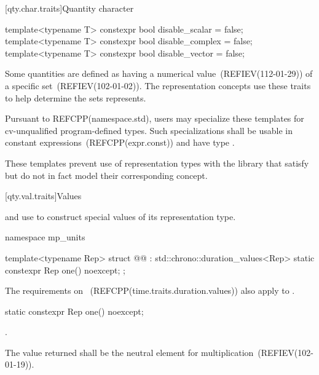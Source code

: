 [qty.char.traits]{Quantity character}

\begin{itemdecl}
template<typename T>
constexpr bool disable_scalar = false;
template<typename T>
constexpr bool disable_complex = false;
template<typename T>
constexpr bool disable_vector = false;
\end{itemdecl}

\begin{itemdescr}
\pnum
Some quantities are defined as having a numerical value~(REFIEV(112-01-29)) of a specific set~(REFIEV(102-01-02)).
The representation concepts use these traits
to help determine the sets  represents.

\pnum
\remarks
Pursuant to REFCPP(namespace.std),
users may specialize these templates
for cv-unqualified program-defined types.
Such specializations shall be usable in constant expressions~(REFCPP(expr.const))
and have type .

\pnum
\begin{note}
These templates prevent use of representation types with the library
that satisfy but do not in fact model their corresponding concept.
\end{note}
\end{itemdescr}

[qty.val.traits]{Values}

\pnum
{} and  use 
to construct special values of its representation type.

\begin{codeblock}
namespace mp_units {

template<typename Rep>
struct @@ : std::chrono::duration_values<Rep> {
  static constexpr Rep one() noexcept;
};

}
\end{codeblock}

\pnum
The requirements on ~(REFCPP(time.traits.duration.values))
also apply to .

\begin{itemdecl}
static constexpr Rep one() noexcept;
\end{itemdecl}

\begin{itemdescr}
\pnum
\returns
{}.

\pnum
\remarks
The value returned shall be the neutral element for multiplication~(REFIEV(102-01-19)).
\end{itemdescr}

